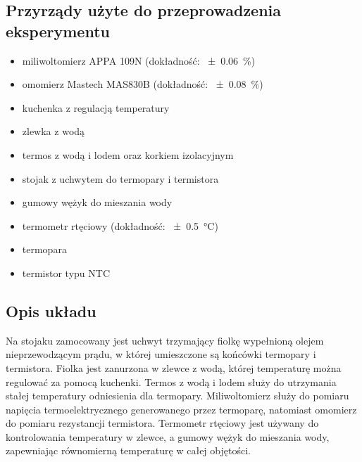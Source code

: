 \documentclass[12pt, a4paper]{article}
\begin{document}
\subsection{Przyrządy użyte do przeprowadzenia eksperymentu}
\begin{itemize}
    \item miliwoltomierz APPA 109N (dokładność: \SI{\pm0.06}{\percent})
    \item omomierz Mastech MAS830B (dokładność: \SI{\pm0.08}{\percent})
    \item kuchenka z regulacją temperatury
    \item zlewka z wodą
    \item termos z wodą i lodem oraz korkiem izolacyjnym
    \item stojak z uchwytem do termopary i termistora
    \item gumowy wężyk do mieszania wody
    \item termometr rtęciowy (dokładność: \SI{\pm0.5}{\degreeCelsius})
    \item termopara
    \item termistor typu NTC
\end{itemize}

\subsection{Opis układu}
Na stojaku zamocowany jest uchwyt trzymający fiolkę wypełnioną olejem
nieprzewodzącym prądu, w której umieszczone są końcówki termopary i termistora.
Fiolka jest zanurzona w zlewce z wodą, której temperaturę można regulować za
pomocą kuchenki. Termos z wodą i lodem służy do utrzymania stałej temperatury
odniesienia dla termopary. Miliwoltomierz służy do pomiaru napięcia
termoelektrycznego generowanego przez termoparę, natomiast omomierz do pomiaru
rezystancji termistora. Termometr rtęciowy jest używany do kontrolowania
temperatury w zlewce, a gumowy wężyk do mieszania wody, zapewniając równomierną
temperaturę w całej objętości.
\end{document}
